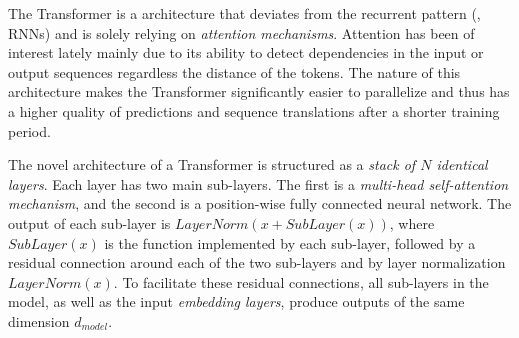 
The Transformer is a \dnn architecture that deviates from the recurrent pattern
(\eg, RNNs) and is solely relying on \emph{attention mechanisms}. Attention has
been of interest lately \citep{Bahdanau2015, Kim2017, Vaswani_2017} mainly due
to its ability to detect dependencies in the input or output sequences
regardless the distance of the tokens. The nature of this architecture makes the
Transformer significantly easier to parallelize and thus has a higher quality of
predictions and sequence translations after a shorter training period.

The novel architecture of a Transformer \citep{Vaswani_2017} is structured as a
\emph{stack of $N$ identical layers}. Each layer has two main sub-layers. The
first is a \emph{multi-head self-attention mechanism}, and the second is a
position-wise fully connected neural network. The output of each sub-layer is
$LayerNorm(x + SubLayer(x))$, where $SubLayer(x)$ is the function implemented by
each sub-layer, followed by a residual connection around each of the two
sub-layers and  by layer normalization $LayerNorm(x)$. To facilitate these
residual connections, all sub-layers in the model, as well as the input
\emph{embedding layers}, produce outputs of the same dimension $d_{model}$.


